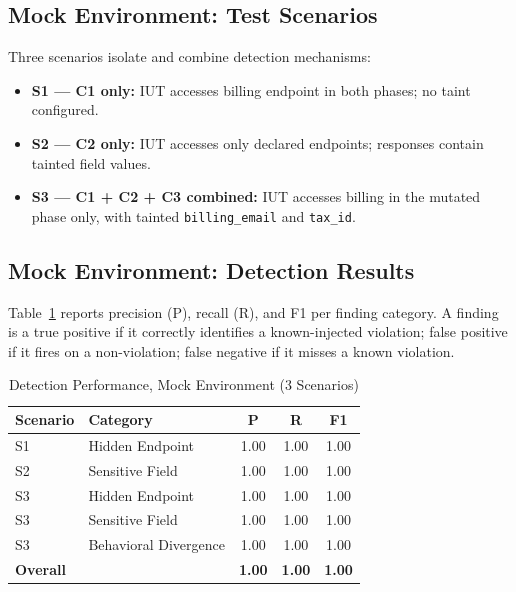 \documentclass[conference]{IEEEtran}
\begin{document}
\subsection{Mock Environment: Test Scenarios}

Three scenarios isolate and combine detection mechanisms:

\begin{itemize}
  \item \textbf{S1 --- C1 only:} IUT accesses billing endpoint in
        both phases; no taint configured.
  \item \textbf{S2 --- C2 only:} IUT accesses only declared endpoints;
        responses contain tainted field values.
  \item \textbf{S3 --- C1 + C2 + C3 combined:} IUT accesses billing
        in the mutated phase only, with tainted \texttt{billing\_email}
        and \texttt{tax\_id}.
\end{itemize}

\subsection{Mock Environment: Detection Results}

Table~\ref{tab:results} reports precision (P), recall (R), and F1 per
finding category. A finding is a true positive if it correctly
identifies a known-injected violation; false positive if it fires on
a non-violation; false negative if it misses a known violation.

\begin{table}[htbp]
  \caption{Detection Performance, Mock Environment (3 Scenarios)}
  \label{tab:results}
  \centering
  \renewcommand{\arraystretch}{1.25}
  \begin{tabular}{llccc}
    \toprule
    \textbf{Scenario} & \textbf{Category} & \textbf{P} & \textbf{R} & \textbf{F1} \\
    \midrule
    S1 & Hidden Endpoint       & 1.00 & 1.00 & 1.00 \\
    S2 & Sensitive Field       & 1.00 & 1.00 & 1.00 \\
    S3 & Hidden Endpoint       & 1.00 & 1.00 & 1.00 \\
    S3 & Sensitive Field       & 1.00 & 1.00 & 1.00 \\
    S3 & Behavioral Divergence & 1.00 & 1.00 & 1.00 \\
    \midrule
    \multicolumn{2}{l}{\textbf{Overall}} & \textbf{1.00} & \textbf{1.00} & \textbf{1.00} \\
    \bottomrule
  \end{tabular}
\end{table}
\end{document}

